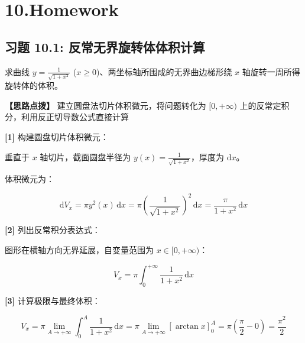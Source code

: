 \documentclass[11pt,a4paper,UTF8]{ctexart}
\begin{document}
\pagestyle{fancy}
\fancyhf{}
\fancyhead[R]{\small\color{TitlePurple}\nouppercase{\leftmark}}
\renewcommand{\headrulewidth}{0.5pt}

\tableofcontents
\newpage
{}


\section{10.Homework}


\subsection{习题 10.1: 反常无界旋转体体积计算}

求曲线 $y = \frac{1}{\sqrt{1+x^2}}$ ($x \geqslant 0$)、两坐标轴所围成的无界曲边梯形绕 $x$ 轴旋转一周所得旋转体的体积。

\textbf{\color{DeepPurple}【思路点拨】} 建立圆盘法切片体积微元，将问题转化为 $[0, +\infty)$ 上的反常定积分，利用反正切导数公式直接计算


\begin{solbox}[分步推导与答题规范]
\textbf{[1]} 构建圆盘切片体积微元：

垂直于 $x$ 轴切片，截面圆盘半径为 $y(x) = \frac{1}{\sqrt{1+x^2}}$，厚度为 $\mathrm{d}x$。

体积微元为：


\begin{equation*}
\mathrm{d}V_x = \pi y^2(x)\,\mathrm{d}x = \pi \left(\frac{1}{\sqrt{1+x^2}}\right)^2\,\mathrm{d}x = \frac{\pi}{1+x^2}\,\mathrm{d}x
\end{equation*}


\textbf{[2]} 列出反常积分表达式：

图形在横轴方向无界延展，自变量范围为 $x \in [0, +\infty)$：


\begin{equation*}
V_x = \pi \int_0^{+\infty} \frac{1}{1+x^2}\,\mathrm{d}x
\end{equation*}


\textbf{[3]} 计算极限与最终体积：


\begin{equation*}
V_x = \pi \lim_{A \to +\infty} \int_0^A \frac{1}{1+x^2}\,\mathrm{d}x = \pi \lim_{A \to +\infty} [\arctan x]_0^A = \pi \left(\frac{\pi}{2} - 0\right) = \frac{\pi^2}{2}
\end{equation*}

\end{solbox}
\end{document}
